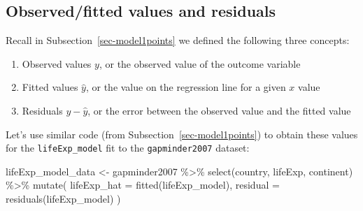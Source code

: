 \documentclass[
  letterpaper,
  DIV=11,
  numbers=noendperiod]{scrreprt}
\newenvironment{Shaded}{\begin{snugshade}}{\end{snugshade}}
\newcommand{\AttributeTok}[1]{\textcolor[rgb]{0.40,0.45,0.13}{#1}}
\newcommand{\FunctionTok}[1]{\textcolor[rgb]{0.28,0.35,0.67}{#1}}
\newcommand{\NormalTok}[1]{\textcolor[rgb]{0.00,0.23,0.31}{#1}}
\newcommand{\OtherTok}[1]{\textcolor[rgb]{0.00,0.23,0.31}{#1}}
\newcommand{\SpecialCharTok}[1]{\textcolor[rgb]{0.37,0.37,0.37}{#1}}
\theoremstyle{definition}
\theoremstyle{remark}
\begin{document}
\hypertarget{sec-model2points}{%
\subsection{Observed/fitted values and
residuals}\label{sec-model2points}}

Recall in Subsection~\ref{sec-model1points} we defined the following
three concepts:

\begin{enumerate}
\def\labelenumi{\arabic{enumi}.}
\item
  Observed values \(y\), or the observed value of the outcome variable
\item
  Fitted values \(\widehat{y}\), or the value on the regression line for
  a given \(x\) value
\item
  Residuals \(y - \widehat{y}\), or the error between the observed value
  and the fitted value
\end{enumerate}

Let's use similar code (from Subsection~\ref{sec-model1points}) to
obtain these values for the \texttt{lifeExp\_model} fit to the
\texttt{gapminder2007} dataset:

\begin{Shaded}
\begin{Highlighting}[]
\NormalTok{lifeExp\_model\_data }\OtherTok{\textless{}{-}}\NormalTok{ gapminder2007 }\SpecialCharTok{\%\textgreater{}\%} 
  \FunctionTok{select}\NormalTok{(country, lifeExp, continent) }\SpecialCharTok{\%\textgreater{}\%} 
  \FunctionTok{mutate}\NormalTok{(}
    \AttributeTok{lifeExp\_hat =} \FunctionTok{fitted}\NormalTok{(lifeExp\_model),}
    \AttributeTok{residual =} \FunctionTok{residuals}\NormalTok{(lifeExp\_model)}
\NormalTok{    )}
\end{Highlighting}
\end{Shaded}
\end{document}
